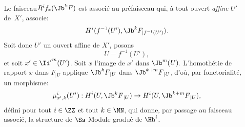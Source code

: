 {Le faisceau\pageoriginale $R^if_*({\Jb}^k F)$ est associ\'e au pr\'efaisceau qui, \`a tout ouvert \emph{affine} $U'$ de~$X'$, associe:
\begin{equation} \label{eq:IX.1.10} H^i(f^{-1}(U'), {\Jb}^k F_{|f^{-1}(U')}).
\end{equation}
}  {Soit donc $U'$ un ouvert affine de $X'$, posons
\begin{equation*} U=f^{-1}(U'),
\end{equation*}
et soit $x'\in {\Ii'}^m(U')$. Soit $x$ l'image de $x'$ dans ${\Jb}^{{m}} (U)$. L'homoth\'etie de rapport $x$ dans $F_{|U}$ applique ${\Jb}^kF{_{|U}}$ dans ${\Jb}^{k+m}F{_{|U}}$, d'o\`u, par fonctorialit\'e, un morphisme:
\begin{equation} \label{eq:IX.1.11} \mu^i_{x', k}(U'):H^i(U, {\Jb}^kF{_{|U}})\to H^i(U, {\Jb}^{k+m}F{_{|U}}),
\end{equation}
d\'efini pour tout $i \in \ZZ$ et tout $k \in \NN$, qui donne, par passage au faisceau associ\'e, la structure de $\Ss$-Module gradu\'e de $\Hh^i$.}

